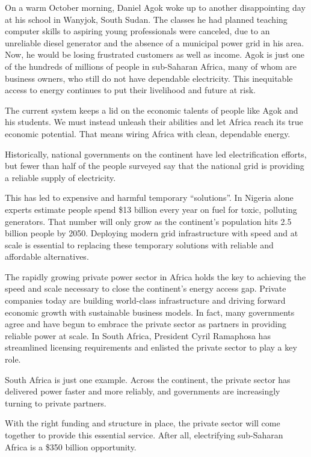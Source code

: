 \documentclass[UTF8,11pt]{ctexart}
\begin{document}
On a warm October morning, Daniel Agok woke up to another disappointing day at his school in Wanyjok, South Sudan. The classes he had planned teaching computer skills to aspiring young professionals were canceled, due to an unreliable diesel generator and the absence of a municipal power grid in his area. Now, he would be losing frustrated customers as well as income. Agok is just one of the hundreds of millions of people in sub-Saharan Africa, many of whom are business owners, who still do not have dependable electricity. This inequitable access to energy continues to put their livelihood and future at risk.


The current system keeps a lid on the economic talents of people like Agok and his students. We must instead unleash their abilities and let Africa reach its true economic potential. That means wiring Africa with clean, dependable energy.


Historically, national governments on the continent have led electrification efforts, but fewer than half of the people surveyed say that the national grid is providing a reliable supply of electricity.


This has led to expensive and harmful temporary “solutions”. In Nigeria alone experts estimate people spend \$13 billion every year on fuel for toxic, polluting generators. That number will only grow as the continent’s population hits 2.5 billion people by 2050. Deploying modern grid infrastructure with speed and at scale is essential to replacing these temporary solutions with reliable and affordable alternatives.


The rapidly growing private power sector in Africa holds the key to achieving the speed and scale necessary to close the continent’s energy access gap. Private companies today are building world-class infrastructure and driving forward economic growth with sustainable business models. In fact, many governments agree and have begun to embrace the private sector as partners in providing reliable power at scale. In South Africa, President Cyril Ramaphosa has streamlined licensing requirements and enlisted the private sector to play a key role.


South Africa is just one example. Across the continent, the private sector has delivered power faster and more reliably, and governments are increasingly turning to private partners.


With the right funding and structure in place, the private sector will come together to provide this essential service. After all, electrifying sub-Saharan Africa is a \$350 billion opportunity.
\end{document}
